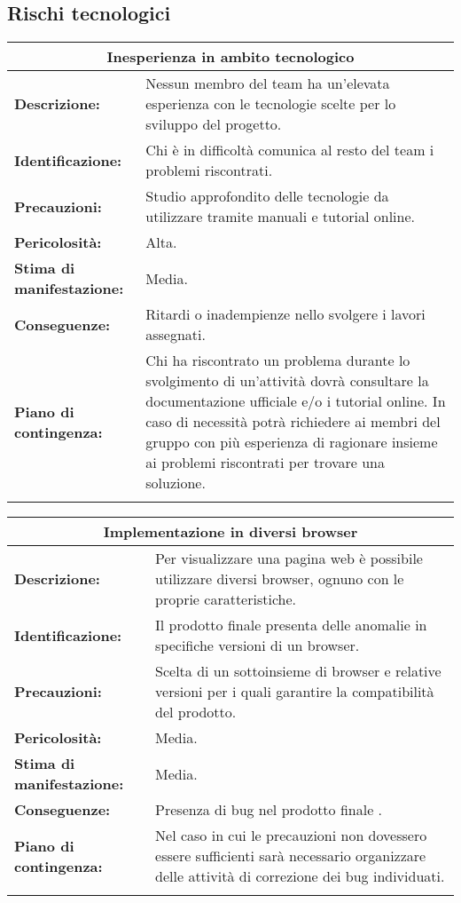 \subsection{Rischi tecnologici}

\renewcommand\tabularxcolumn[1]{>{\Centering}m{#1}}
\begin{tabularx}{\textwidth}{|X|X|}
\hline
\multicolumn{2}{|c|}{\textbf{Inesperienza in ambito tecnologico}} \\
\hline
\textbf{Descrizione:}& Nessun membro del team ha un'elevata esperienza con le tecnologie scelte per lo sviluppo del progetto.\\
\hline
\textbf{Identificazione:}& Chi è in difficoltà comunica al resto del team i problemi riscontrati.\\
\hline
\textbf{Precauzioni:}& Studio approfondito delle tecnologie da utilizzare tramite manuali e tutorial online.\\
\hline
\textbf{Pericolosità:}& Alta.\\
\hline
\textbf{Stima di manifestazione:}& Media.\\
\hline
\textbf{Conseguenze:}& Ritardi o inadempienze nello svolgere i lavori assegnati.\\
\hline
\textbf{Piano di contingenza:}& Chi ha riscontrato un problema durante lo svolgimento di un'attività dovrà consultare la documentazione ufficiale e/o i tutorial online. In caso di necessità potrà richiedere ai membri del gruppo con più esperienza di ragionare insieme ai problemi riscontrati per trovare una soluzione.\\
\hline
\caption{Inesperienza in ambito tecnologico}
\end{tabularx}

\vspace{20pt}

\begin{tabularx}{\textwidth}{|X|X|}
\hline
\multicolumn{2}{|c|}{\textbf{Implementazione in diversi browser}} \\
\hline
\textbf{Descrizione:}& Per visualizzare una pagina web è possibile utilizzare diversi browser, ognuno con le proprie caratteristiche.\\
\hline
\textbf{Identificazione:}& Il prodotto finale presenta delle anomalie in specifiche versioni di un browser. \\
\hline
\textbf{Precauzioni:}& Scelta di un sottoinsieme di browser e relative versioni per i quali garantire la compatibilità del prodotto. \\
\hline
\textbf{Pericolosità:}& Media.\\
\hline
\textbf{Stima di manifestazione:}& Media.\\
\hline
\textbf{Conseguenze:}& Presenza di bug nel prodotto finale .\\
\hline
\textbf{Piano di contingenza:}& Nel caso in cui le precauzioni non dovessero essere sufficienti sarà necessario organizzare delle attività di correzione dei bug individuati. \\
\hline
\caption{Implementazione in diversi browser}
\end{tabularx}

